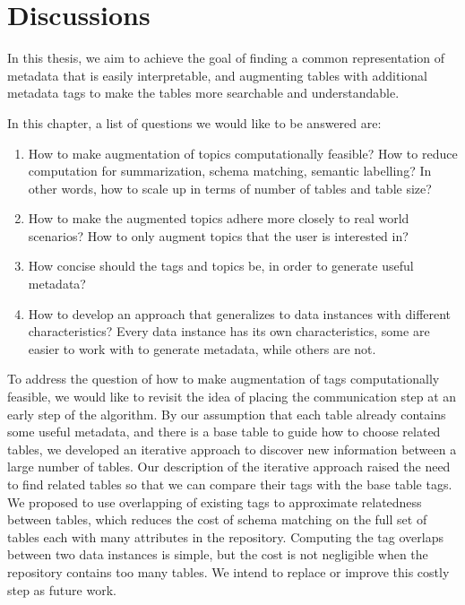 
\chapter{Discussions}
\label{ch:Discussions}

In this thesis, we aim to achieve the goal of finding a common representation of metadata that is easily interpretable, and augmenting tables with additional metadata tags to make the tables more searchable and understandable.

In this chapter, a list of questions we would like to be answered are:
\begin{enumerate}
\item How to make augmentation of topics computationally feasible? How to reduce computation for summarization, schema matching, semantic labelling? In other words, how to scale up in terms of number of tables and table size?
\item How to make the augmented topics adhere more closely to real world scenarios? How to only augment topics that the user is interested in?
\item How concise should the tags and topics be, in order to generate useful metadata?
\item How to develop an approach that generalizes to data instances with different characteristics? Every data instance has its own characteristics, some are easier to work with to generate metadata, while others are not.	
\end{enumerate}

To address the question of how to make augmentation of tags computationally feasible, we would like to revisit the idea of placing the communication step at an early step of the algorithm. By our assumption that each table already contains some useful metadata, and there is a base table to guide how to choose related tables, we developed an iterative approach to discover new information between a large number of tables. Our description of the iterative approach raised the need to find related tables so that we can compare their tags with the base table tags. We proposed to use overlapping of existing tags to approximate relatedness between tables, which reduces the cost of schema matching on the full set of tables each with many attributes in the repository. Computing the tag overlaps between two data instances is simple, but the cost is not negligible when the repository contains too many tables. We intend to replace or improve this costly step as future work.

